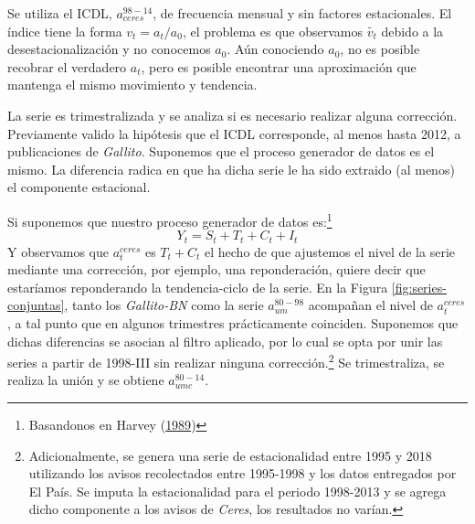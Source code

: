 \documentclass[12pt,oneside]{reedthesis}
\begin{document}
Se utiliza el ICDL, \(a_{ceres}^{98-14}\), de frecuencia mensual y sin factores estacionales. El índice tiene la forma \(v_t = a_t/a_0\), el problema es que observamos \(\tilde{v_t}\) debido a la desestacionalización y no conocemos \(a_0\). Aún conociendo \(a_0\), no es posible recobrar el verdadero \(a_t\), pero es posible encontrar una aproximación que mantenga el mismo movimiento y tendencia.

La serie es trimestralizada y se analiza si es necesario realizar alguna corrección. Previamente valido la hipótesis que el ICDL corresponde, al menos hasta 2012, a publicaciones de \emph{Gallito}. Suponemos que el proceso generador de datos es el mismo. La diferencia radica en que ha dicha serie le ha sido extraido (al menos) el componente estacional.

Si suponemos que nuestro proceso generador de datos es:\footnote{Basandonos en Harvey (\protect\hyperlink{ref-Harvey1989}{1989})}
\begin{equation}
Y_t = S_t + T_t + C_t + I_t
\end{equation}
Y observamos que \(a_t^{ceres}\) es \(T_t + C_t\) el hecho de que ajustemos el nivel de la serie mediante una corrección, por ejemplo, una reponderación, quiere decir que estaríamos reponderando la tendencia-ciclo de la serie. En la Figura \ref{fig:series-conjuntas}, tanto los \emph{Gallito-BN} como la serie \(a_{um}^{80-98}\) acompañan el nivel de \(a_t^{ceres}\), a tal punto que en algunos trimestres prácticamente coinciden. Suponemos que dichas diferencias se asocian al filtro aplicado, por lo cual se opta por unir las series a partir de 1998-III sin realizar ninguna corrección.\footnote{Adicionalmente, se genera una serie de estacionalidad entre 1995 y 2018 utilizando los avisos recolectados entre 1995-1998 y los datos entregados por El País. Se imputa la estacionalidad para el periodo 1998-2013 y se agrega dicho componente a los avisos de \emph{Ceres}, los resultados no varían.}
Se trimestraliza, se realiza la unión y se obtiene \(a_{umc}^{80-14}\).
\end{document}
